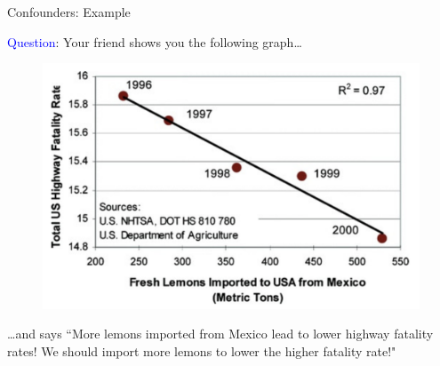 \documentclass[10pt,t]{beamer}
\begin{document}
\begin{frame}{Confounders: Example}

\textcolor{blue}{Question}: Your friend shows you the following graph\dots

\vspace{0.1cm}

\begin{figure}
	\centering \includegraphics[scale=0.4]{lemons.png}
\end{figure}

\vspace{0.1cm} 

\dots and says ``More lemons imported from Mexico lead to lower highway fatality rates! We should import more lemons to lower the higher fatality rate!"



\end{frame}
\end{document}
